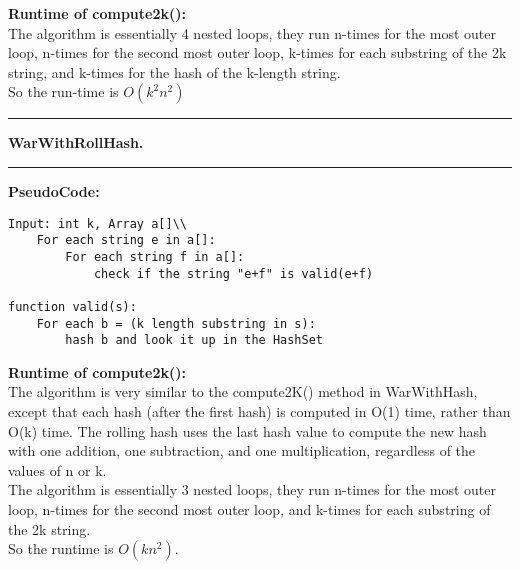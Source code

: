 \documentclass[11pt]{article}
\newcommand\question[2]{\vspace{.25in}\hrule\textbf{#1. #2}\vspace{.5em}\hrule\vspace{.10in}}
\begin{document}
\textbf{Runtime of compute2k():}\\
The algorithm is essentially 4 nested loops, they run n-times for the most outer loop, n-times for the second most outer loop, k-times for each substring of the 2k string, and k-times for the hash of the k-length string.\\
So the run-time is $O(k^2n^2)$


\question{WarWithRollHash}{}

\textbf{PseudoCode:}\\

\begin{verbatim}
Input: int k, Array a[]\\
    For each string e in a[]:
        For each string f in a[]:
            check if the string "e+f" is valid(e+f)
			
function valid(s):
    For each b = (k length substring in s):
        hash b and look it up in the HashSet
\end{verbatim}


\textbf{Runtime of compute2k():}\\
The algorithm is very similar to the compute2K() method in WarWithHash, except that each hash (after the first hash) is computed in O(1) time, rather than O(k) time. The rolling hash uses the last hash value to compute the new hash with one addition, one subtraction, and one multiplication, regardless of the values of n or k.\\
The algorithm is essentially 3 nested loops, they run n-times for the most outer loop, n-times for the second most outer loop, and k-times for each substring of the 2k string.\\
So the runtime is $O(kn^2).$
\end{document}

